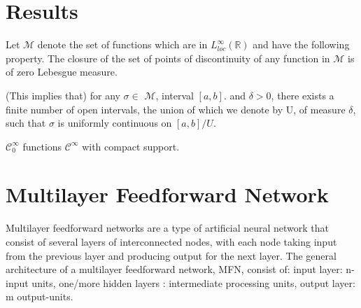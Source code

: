 \documentclass[../main.tex]{subfiles}
\begin{document}
\section{Results}
\begin{definition} Let $\mathcal{M}$ denote the set of functions which are in $L_{loc}^{\infty}(\mathbb{R})$ and have the following property. The closure of the set of points of discontinuity of any function in $\mathcal{M}$ is of zero Lebesgue measure. 
\begin{propo}
(This implies that) for any $\sigma \in$ $\mathcal{M}$, interval $[a,b] .$ and $\delta >0$, there exists a finite number of open intervals, the union of which we denote by U, of measure $\delta$, such that $\sigma$ is uniformly continuous on $[a,b]/U$. 
\end{propo}
\end{definition}

\begin{definition} 
	$ \mathcal{C}^\infty_0$ functions $\mathcal{C}^\infty$ with compact support.  
\end{definition}

\section{Multilayer Feedforward Network}
\noindent Multilayer feedforward networks are a type of artificial neural network that consist of several layers of interconnected nodes, with each node taking input from the previous layer and producing output for the next layer. The general architecture of a multilayer feedforward network, MFN, consist of: input layer: n-input units,  one/more hidden layers : intermediate processing units, output layer: m output-units. 
\end{document}
